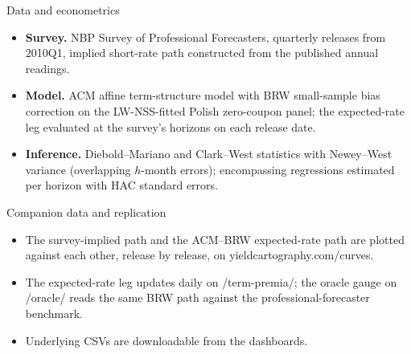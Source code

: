 \documentclass[aspectratio=169,11pt]{beamer}
\begin{document}
\begin{frame}{Data and econometrics}
  \small
  \begin{itemize}
    \item \textbf{Survey.} NBP Survey of Professional Forecasters, quarterly
          releases from 2010Q1, implied short-rate path constructed from the
          published annual readings.
    \item \textbf{Model.} ACM affine term-structure model with BRW
          small-sample bias correction on the LW-NSS-fitted Polish zero-coupon
          panel; the expected-rate leg evaluated at the survey's horizons on
          each release date.
    \item \textbf{Inference.} Diebold--Mariano and Clark--West statistics with
          Newey--West variance (overlapping $h$-month errors); encompassing
          regressions estimated per horizon with HAC standard errors.
  \end{itemize}
\end{frame}

\begin{frame}{Companion data and replication}
  \begin{itemize}
    \item The survey-implied path and the ACM--BRW expected-rate path are
          plotted against each other, release by release, on
          \textcolor{ycaccent}{\ttfamily yieldcartography.com/curves}.
    \item The expected-rate leg updates daily on
          \textcolor{ycaccent}{\ttfamily /term-premia/}; the oracle gauge on
          \textcolor{ycaccent}{\ttfamily /oracle/} reads the same BRW path
          against the professional-forecaster benchmark.
    \item Underlying CSVs are downloadable from the dashboards.
  \end{itemize}
\end{frame}
\end{document}
